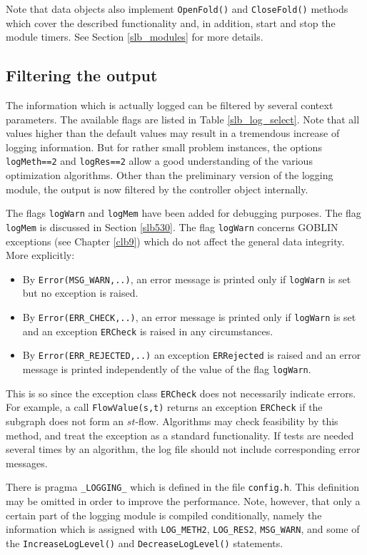 \documentclass[a4paper,11pt,twoside]{book}
\begin{document}
\begin{multicols}{2}
Note that data objects also implement \verb/OpenFold()/ and \verb/CloseFold()/
methods which cover the described functionality and, in addition, start and
stop the module timers. See Section \ref{slb_modules} for more details.


\subsection{Filtering the output}
The information which is actually logged can be filtered by several context
parameters. The available flags are listed in Table \ref{slb_log_select}.
Note that all values higher than the default values may result in a tremendous
increase of logging information. But for rather small problem instances, the
options \verb/logMeth==2/ and \verb/logRes==2/ allow a good understanding of
the various optimization algorithms. Other than the preliminary version of the
logging module, the output is now filtered by the controller object internally.

The flags \verb/logWarn/ and \verb/logMem/ have been added for debugging
purposes. The flag \verb/logMem/ is discussed in Section \ref{slb530}. The flag
\verb/logWarn/ concerns GOBLIN exceptions (see Chapter \ref{clb9}) which do
not affect the general data integrity. More explicitly:
\begin{itemize}
\item By \verb/Error(MSG_WARN,..)/, an error message is printed only if
\verb/logWarn/ is set but no exception is raised.
\item By \verb/Error(ERR_CHECK,..)/, an error message is printed only if
\verb/logWarn/ is set and an exception \verb/ERCheck/ is raised in any
circumstances.
\item By \verb/Error(ERR_REJECTED,..)/ an exception \verb/ERRejected/ is raised
and an error message is printed independently of the value of the flag
\verb/logWarn/.
\end{itemize}
This is so since the exception class \verb/ERCheck/ does not necessarily
indicate errors. For example, a call \verb/FlowValue(s,t)/ returns an exception
\verb/ERCheck/ if the subgraph does not form an $st$-flow. Algorithms may
check feasibility by this method, and treat the exception as a standard
functionality. If tests are needed several times by an algorithm,
the log file should not include corresponding error messages.

There is pragma \verb/_LOGGING_/ which is defined in the file \verb/config.h/.
This definition may be omitted in order to improve the performance.
Note, however, that only a certain part of the logging module is compiled
conditionally, namely the information which is assigned with \verb/LOG_METH2/,
\verb/LOG_RES2/, \verb/MSG_WARN/, and some of the \verb/IncreaseLogLevel()/ and
\verb/DecreaseLogLevel()/ statements.



\end{multicols}
\end{document}
